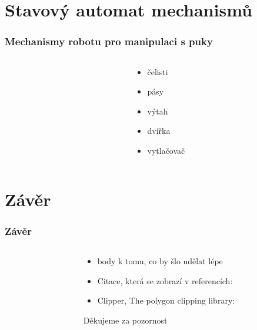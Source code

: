 \documentclass[notes=false,pdftex]{beamer}
\begin{document}

\section{Stavový automat mechanismů}
\begin{frame}
	\frametitle{Mechanismy robotu pro manipulaci s puky}

	\begin{columns}[T]
		\begin{column}{0.75\textwidth}
		\end{column}
		\begin{column}{0.25\textwidth}
			\begin{itemize}
				\item[1.] čelisti
				\item[2.] pásy
				\item[3.] výtah
				\item[4.] dvířka
				\item[5.] vytlačovač
			\end{itemize}
		\end{column}
	\end{columns}

\end{frame}


\section{Závěr}
\begin{frame}
	\frametitle{Závěr}

	\begin{columns}[T]
		\begin{column}{0.5\textwidth}
		\end{column}
		\begin{column}{0.5\textwidth}
			\begin{itemize}
				\item body k tomu, co by šlo udělat lépe\pause
				\item Citace, která se zobrazí v referencích: \cite{Wurm2008Coordinated}
				\item Clipper, The polygon clipping library: \cite{ClipperLib}
			\end{itemize}
			\pause
			\vspace{13ex}\hspace*{\fill}Děkujeme za pozornost
		\end{column}
	\end{columns}

\end{frame}
\end{document}
